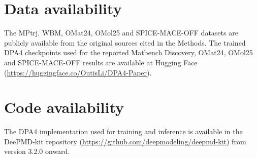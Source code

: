 \section{Data availability}

The MPtrj, WBM, OMat24, OMol25 and SPICE-MACE-OFF datasets are publicly available from the original sources cited in the Methods.
The trained DPA4 checkpoints used for the reported Matbench Discovery, OMat24, OMol25 and SPICE-MACE-OFF results are available at Hugging Face (\url{https://huggingface.co/OutisLi/DPA4-Paper}).

\section{Code availability}

The DPA4 implementation used for training and inference is available in the DeePMD-kit repository (\url{https://github.com/deepmodeling/deepmd-kit}) from version 3.2.0 onward.
